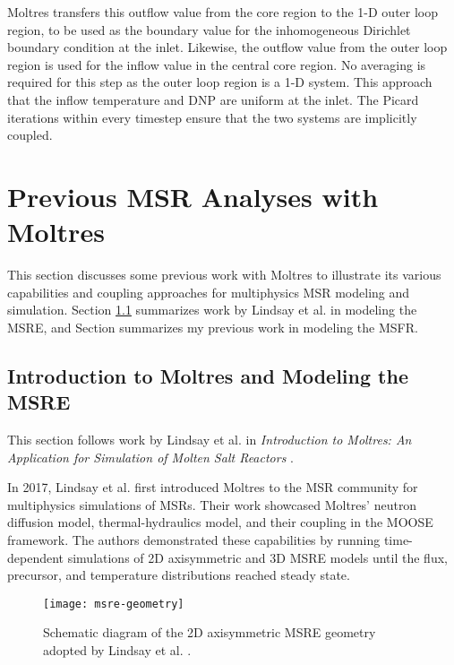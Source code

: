Moltres transfers this outflow value from the core region to the 1-D
outer loop region, to be used as the boundary value for the inhomogeneous
Dirichlet boundary
condition at the inlet. Likewise, the outflow value from the outer
loop region is used for the inflow value in the central core region. No
averaging is required for this step as the outer loop region is a 1-D system.
This approach that the inflow temperature and \gls{DNP} are uniform at the
inlet. The Picard iterations within every timestep ensure that the two systems
are implicitly coupled.

\section{Previous \gls{MSR} Analyses with Moltres} \label{sec:moltres-previous}

This section discusses some previous work with Moltres to illustrate its
various capabilities and coupling approaches for multiphysics \gls{MSR}
modeling and simulation. Section \ref{sec:msre} summarizes work by Lindsay et
al. \cite{lindsay_introduction_2018} in modeling the \gls{MSRE}, and Section
\cite{park_advancement_2020} summarizes my previous work in modeling the
\gls{MSFR}.

\subsection{Introduction to Moltres and Modeling the MSRE} \label{sec:msre}

This section follows work by Lindsay et al. in \textit{Introduction to Moltres:
An Application for Simulation of Molten Salt Reactors}
\cite{lindsay_introduction_2018}.

In 2017, Lindsay et al. first introduced
Moltres to the \gls{MSR} community for multiphysics simulations of \glspl{MSR}.
Their work showcased Moltres' neutron diffusion model, thermal-hydraulics
model, and their coupling in the \gls{MOOSE} framework. The authors
demonstrated these capabilities by running time-dependent simulations of 2D
axisymmetric and 3D \gls{MSRE} models until the flux, precursor, and
temperature distributions reached steady state.

\begin{figure}[htb!]
	\centering
	\texttt{[image: msre-geometry]}
	\caption{Schematic diagram of the 2D axisymmetric \gls{MSRE} geometry
	adopted by Lindsay et al. \cite{lindsay_introduction_2018}.}
	\label{fig:msre-geometry}
\end{figure}

